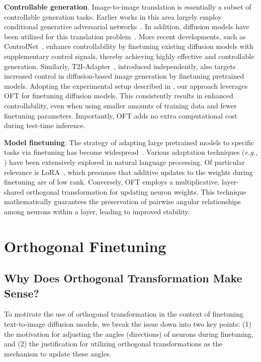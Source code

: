 \textbf{Controllable generation}. Image-to-image translation is essentially a subset of controllable generation tasks. Earlier works in this area largely employ conditional generative adversarial networks~\cite{isola2017image,zhu2017toward,wang2018high,park2019semantic,choi2018stargan}. In addition, diffusion models have been utilized for this translation problem~\cite{saharia2022palette,voynov2022sketch,wang2022pretraining}. More recent developments, such as ControlNet~\cite{zhang2023adding}, enhance controllability by finetuning existing diffusion models with supplementary control signals, thereby achieving highly effective and controllable generation. Similarly, T2I-Adapter~\cite{mou2023t2i}, introduced independently, also targets increased control in diffusion-based image generation by finetuning pretrained models. Adopting the experimental setup described in \cite{zhang2023adding,mou2023t2i}, our approach leverages OFT for finetuning diffusion models. This consistently results in enhanced controllability, even when using smaller amounts of training data and fewer finetuning parameters. Importantly, OFT adds no extra computational cost during test-time inference.

\textbf{Model finetuning}. The strategy of adapting large pretrained models to specific tasks via finetuning has become widespread~\cite{devlin2018bert,brown2020language,he2022masked}. Various adaptation techniques (\emph{e.g.}, \cite{hulora2022,houlsby2019parameter,pfeiffer2020adapterfusion}) have been extensively explored in natural language processing. Of particular relevance is LoRA~\cite{hulora2022}, which presumes that additive updates to the weights during finetuning are of low rank. Conversely, OFT employs a multiplicative, layer-shared orthogonal transformation for updating neuron weights. This technique mathematically guarantees the preservation of pairwise angular relationships among neurons within a layer, leading to improved stability.

\section{Orthogonal Finetuning}

\subsection{Why Does Orthogonal Transformation Make Sense?}

To motivate the use of orthogonal transformation in the context of finetuning text-to-image diffusion models, we break the issue down into two key points: (1) the motivation for adjusting the angles (directions) of neurons during finetuning, and (2) the justification for utilizing orthogonal transformations as the mechanism to update these angles.


